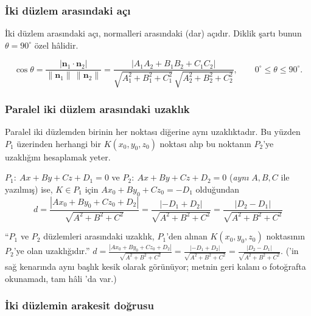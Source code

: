 \subsubsection{İki düzlem arasındaki açı}

\begin{bilgi}
İki düzlem arasındaki açı, normalleri arasındaki (dar) açıdır. Diklik şartı bunun $\theta=90^\circ$ özel hâlidir.
\end{bilgi}
\begin{teorem}
\[ \cos\theta=\frac{|\mathbf n_1\cdot\mathbf n_2|}{\|\mathbf n_1\|\,\|\mathbf n_2\|}=\frac{|A_1A_2+B_1B_2+C_1C_2|}{\sqrt{A_1^2+B_1^2+C_1^2}\,\sqrt{A_2^2+B_2^2+C_2^2}},\qquad 0^\circ\le\theta\le90^\circ . \]
\end{teorem}

\subsubsection{Paralel iki düzlem arasındaki uzaklık}

Paralel iki düzlemden birinin her noktası diğerine aynı uzaklıktadır. Bu yüzden $P_1$ üzerinden herhangi bir $K(x_0,y_0,z_0)$ noktası alıp bu noktanın $P_2$'ye uzaklığını hesaplamak yeter.

\begin{teorem}
$P_1:\ Ax+By+Cz+D_1=0$ ve $P_2:\ Ax+By+Cz+D_2=0$ (\emph{aynı} $A,B,C$ ile yazılmış) ise, $K\in P_1$ için $Ax_0+By_0+Cz_0=-D_1$ olduğundan
\[ d=\frac{|Ax_0+By_0+Cz_0+D_2|}{\sqrt{A^2+B^2+C^2}}=\frac{|-D_1+D_2|}{\sqrt{A^2+B^2+C^2}}=\boxed{\frac{|D_2-D_1|}{\sqrt{A^2+B^2+C^2}}} \]
\end{teorem}

\begin{tahta}
``$P_1$ ve $P_2$ düzlemleri arasındaki uzaklık, $P_1$'den alınan $K(x_0,y_0,z_0)$ noktasının $P_2$'ye olan uzaklığıdır.''
$d=\frac{|Ax_0+By_0+Cz_0+D_2|}{\sqrt{A^2+B^2+C^2}}=\frac{|-D_1+D_2|}{\sqrt{A^2+B^2+C^2}}=\frac{|D_2-D_1|}{\sqrt{A^2+B^2+C^2}}$.
('in sağ kenarında aynı başlık kesik olarak görünüyor; metnin geri kalanı o fotoğrafta okunamadı, tam hâli 'da var.)
\end{tahta}

\subsubsection{İki düzlemin arakesit doğrusu}

